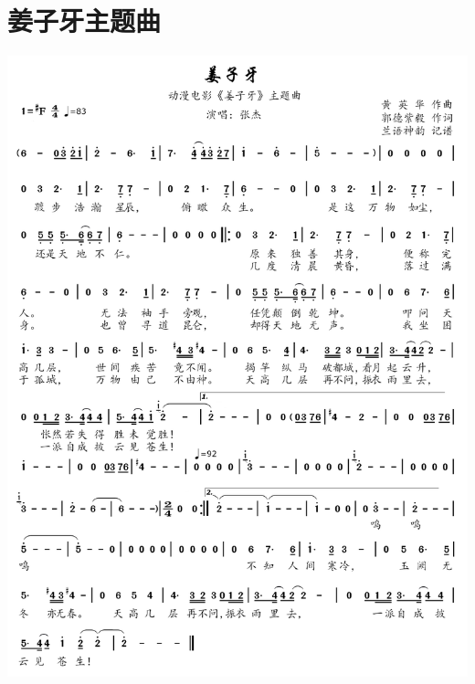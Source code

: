 \documentclass[cn,pad,twocol]{elegantbook}
\begin{document}
\section{姜子牙主题曲} \includegraphics[width=\textwidth]{rpi400/20210206姜子牙主题曲.png}
\end{document}

